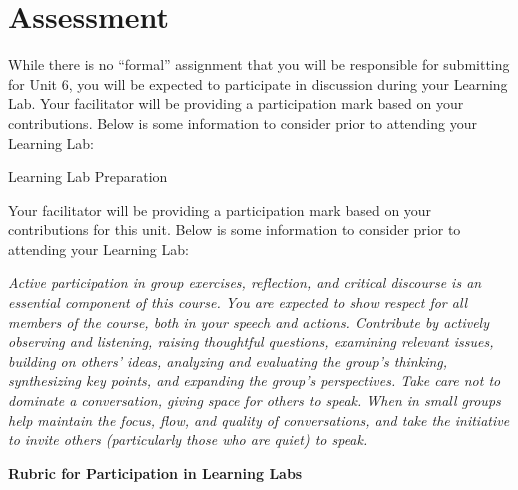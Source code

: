 \documentclass[
]{book}
\begin{document}
\hypertarget{assessment-5}{%
\section*{Assessment}\label{assessment-5}}

\begin{assessment}
While there is no ``formal'' assignment that you will be responsible for submitting for Unit 6, you will be expected to participate in discussion during your Learning Lab. Your facilitator will be providing a participation mark based on your contributions. Below is some information to consider prior to attending your Learning Lab:

{Learning Lab Preparation}

Your facilitator will be providing a participation mark based on your contributions for this unit. Below is some information to consider prior to attending your Learning Lab:

\emph{Active participation in group exercises, reflection, and critical discourse is an essential component of this course. You are expected to show respect for all members of the course, both in your speech and actions. Contribute by actively observing and listening, raising thoughtful questions, examining relevant issues, building on others' ideas, analyzing and evaluating the group's thinking, synthesizing key points, and expanding the group's perspectives. Take care not to dominate a conversation, giving space for others to speak. When in small groups help maintain the focus, flow, and quality of conversations, and take the initiative to invite others (particularly those who are quiet) to speak.}

\textbf{Rubric for Participation in Learning Labs}


\end{assessment}
\end{document}
